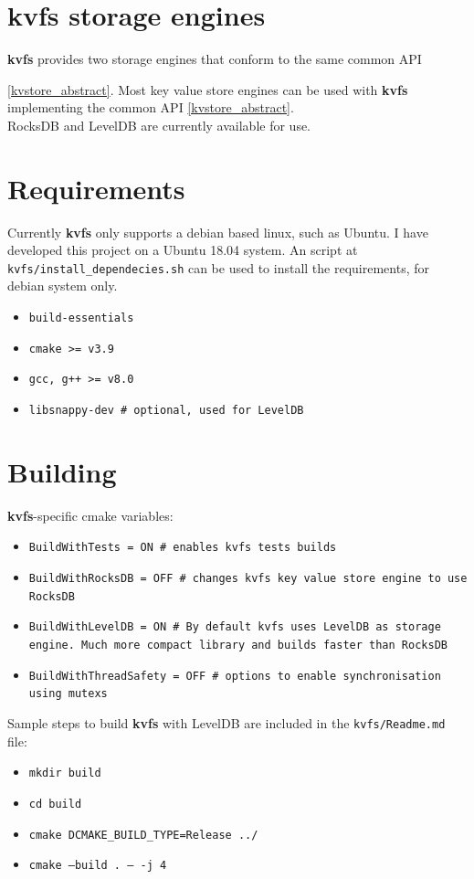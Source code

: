 \documentclass[bsc,frontabs,twoside,singlespacing,parskip,deptreport]{infthesis}     %
\begin{document}
\section{kvfs storage engines}
{\bf kvfs} provides two storage engines that conform to the same common API {\ref{kvstore_abstract}. Most key value store engines can be used with {\bf kvfs} implementing the common API 
\ref{kvstore_abstract}. 
\\ RocksDB and LevelDB are currently available for use. 
\section{Requirements}
Currently {\bf kvfs} only supports a debian based linux, such as Ubuntu. I have developed this project on a Ubuntu 18.04 system. An script at {\tt kvfs/install\_dependecies.sh} can be used to install the requirements, for debian system only.
\begin{itemize}
   \item {\tt build-essentials}
	\item {\tt cmake >= v3.9}
	\item {\tt gcc, g++ >= v8.0}
	\item {\tt libsnappy-dev  \# optional, used for LevelDB}
\end{itemize}
\section{Building}
{\bf kvfs}-specific cmake variables:
\begin{itemize}
	\item {\tt BuildWithTests = ON \# enables kvfs tests builds}
	\item {\tt BuildWithRocksDB = OFF \# changes kvfs key value store engine to use RocksDB}
	\item {\tt BuildWithLevelDB = ON \# By default kvfs uses LevelDB as storage engine. Much more compact library and builds faster than RocksDB}
	\item {\tt BuildWithThreadSafety = OFF \# options to enable synchronisation using mutexs}
\end{itemize}
Sample steps to build {\bf kvfs} with LevelDB are included in the {\tt kvfs/Readme.md} file:
\begin{itemize}
	\item {\tt mkdir build}
	\item {\tt cd build}
	\item {\tt cmake DCMAKE\_BUILD\_TYPE=Release ../}
	\item {\tt cmake --build . -- -j 4}
\end{itemize}

}
\end{document}
